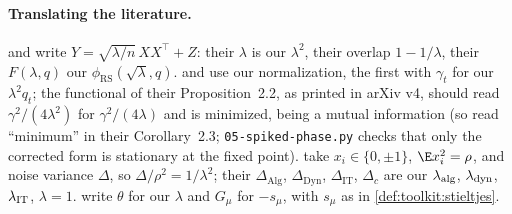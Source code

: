 \begin{refsection}
\paragraph{Translating the literature.} \Textcite{LelargeMiolane2019} and \textcite{DeshpandeAbbeMontanari2016} write $Y=\sqrt{\lambda/n}\,XX^\top+Z$: their $\lambda$ is our $\lambda^2$, their overlap $1-1/\lambda$, their $F(\lambda,q)$ our $\phi_{\mathrm{RS}}(\sqrt\lambda,q)$. \Textcite{MontanariVenkataramanan2021} and \textcite{PerryWeinBandeiraMoitra2018} use our normalization, the first with $\gamma_t$ for our $\lambda^2q_t$; the functional of their Proposition~2.2, as printed in arXiv v4, should read $\gamma^2/(4\lambda^2)$ for $\gamma^2/(4\lambda)$ and is minimized, being a mutual information (so read \enquote{minimum} in their Corollary~2.3; \texttt{05-spiked-phase.py} checks that only the corrected form is stationary at the fixed point). \Textcite{LesieurKrzakalaZdeborova2017} take $x_i\in\{0,\pm1\}$, $\E x_i^2=\rho$, and noise variance $\Delta$, so $\Delta/\rho^2=1/\lambda^2$; their $\Delta_{\mathrm{Alg}}$, $\Delta_{\mathrm{Dyn}}$, $\Delta_{\mathrm{IT}}$, $\Delta_c$ are our $\lambda_{\mathrm{alg}}$, $\lambda_{\mathrm{dyn}}$, $\lambda_{\mathrm{IT}}$, $\lambda=1$. \Textcite{BenaychGeorgesNadakuditi2011} write $\theta$ for our $\lambda$ and $G_\mu$ for $-s_\mu$, with $s_\mu$ as in \cref{def:toolkit:stieltjes}.

\printchapterbib
\end{refsection}

